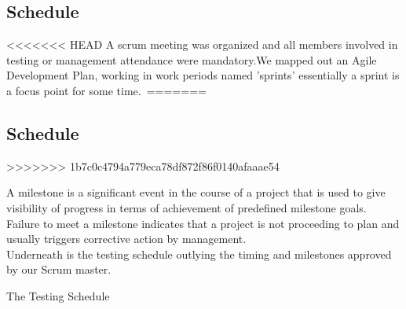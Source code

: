 \subsection{Schedule}



<<<<<<< HEAD
A scrum meeting was organized and all members involved in testing or management attendance were mandatory.We mapped out an Agile Development Plan, working in work periods named 'sprints' essentially a sprint is a focus point for some time.\
=======
\subsection{Schedule}
>>>>>>> 1b7c0c4794a779eca78df872f86f0140afaaae54


A milestone is a significant event in the course of a project that is used to give visibility of progress in terms of achievement of predefined milestone goals. Failure to meet a milestone indicates that a project is not proceeding to plan and usually triggers corrective action by management.\\


Underneath is the testing schedule outlying the timing and milestones approved by our Scrum master.\\


\centerline{ The Testing Schedule}

